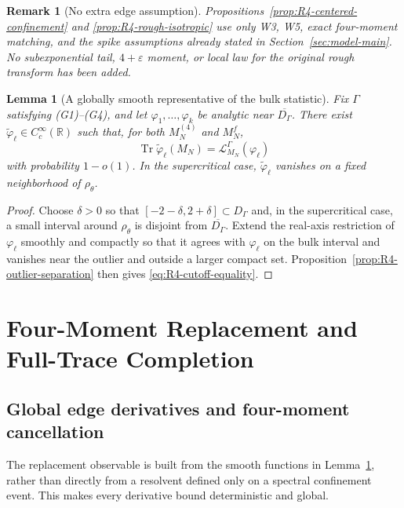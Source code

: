 \documentclass[10pt,a4paper]{amsart}
\newtheorem{lemma}[theorem]{Lemma}
\newtheorem{remark}[theorem]{Remark}
\newcommand{\Tr}{\operatorname{Tr}}
\begin{document}
\begin{remark}[No extra edge assumption]
\label{rem:R4-no-extra-edge-assumption}
Propositions~\ref{prop:R4-centered-confinement} and
\ref{prop:R4-rough-isotropic} use only W3, W5, exact four-moment matching, and
the spike assumptions already stated in Section~\ref{sec:model-main}.  No
subexponential tail, \(4+\varepsilon\) moment, or local law for the original
rough transform has been added.
\end{remark}

\begin{lemma}[A globally smooth representative of the bulk statistic]
\label{lem:R4-smooth-cutoff}
Fix \(\Gamma\) satisfying (G1)--(G4), and let
\(\varphi_1,\ldots,\varphi_k\) be analytic near
\(\overline{D_\Gamma}\).  There exist
\(\widetilde\varphi_\ell\in C_c^\infty(\mathbb R)\) such that, for both
\(M_N^{(4)}\) and \(M_N^f\),
\begin{equation}\label{eq:R4-cutoff-equality}
 \Tr\widetilde\varphi_\ell(M_N)
 =\mathcal L_{M_N}^\Gamma(\varphi_\ell)
\end{equation}
with probability \(1-o(1)\).  In the supercritical case,
\(\widetilde\varphi_\ell\) vanishes on a fixed neighborhood of
\(\rho_\theta\).
\end{lemma}

\begin{proof}
Choose \(\delta>0\) so that
\([-2-\delta,2+\delta]\subset D_\Gamma\) and, in the supercritical case, a
small interval around \(\rho_\theta\) is disjoint from
\(\overline{D_\Gamma}\).  Extend the real-axis restriction of \(\varphi_\ell\)
smoothly and compactly so that it agrees with \(\varphi_\ell\) on the bulk
interval and vanishes near the outlier and outside a larger compact set.
Proposition~\ref{prop:R4-outlier-separation} then gives
\eqref{eq:R4-cutoff-equality}.
\end{proof}


\section{Four-Moment Replacement and Full-Trace Completion}
\label{sec:R5-package}

\subsection{Global edge derivatives and four-moment cancellation}

The replacement observable is built from the smooth functions in
Lemma~\ref{lem:R4-smooth-cutoff}, rather than directly from a resolvent
defined only on a spectral confinement event.  This makes every derivative
bound deterministic and global.
\end{document}
